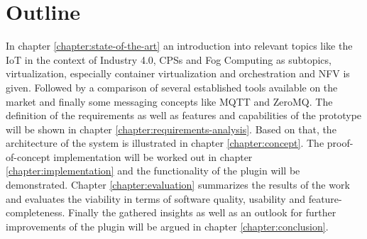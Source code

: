 \section{Outline}
In chapter \ref{chapter:state-of-the-art} an introduction into relevant topics like the \ac{IoT} in the context of Industry 4.0, \acp{CPS} and Fog Computing as subtopics, virtualization, especially container virtualization and orchestration and \ac{NFV} is given.
Followed by a comparison of several established tools available on the market and finally some messaging concepts like \ac{MQTT} and ZeroMQ.
The definition of the requirements as well as features and capabilities of the prototype will be shown in chapter \ref{chapter:requirements-analysis}.
Based on that, the architecture of the system is illustrated in chapter \ref{chapter:concept}.
The proof-of-concept implementation will be worked out in chapter \ref{chapter:implementation} and the functionality of the plugin will be demonstrated.
Chapter \ref{chapter:evaluation} summarizes the results of the work and evaluates the viability in terms of software quality, usability and feature-completeness.
Finally the gathered insights as well as an outlook for further improvements of the plugin will be argued in chapter \ref{chapter:conclusion}.


